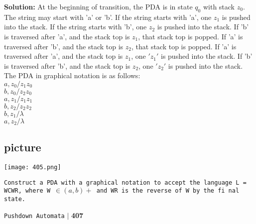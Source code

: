 \documentclass{article}
\begin{document}
\textbf{Solution: }At the beginning of transition, the PDA is in state $q_0$ with stack $z_0$. The string may start with
'a' or 'b'. If the string starts with 'a', one $z_1$ is pushed into the stack. If the string starts with 'b', one $z_2$
is pushed into the stack. If 'b' is traversed after 'a', and the stack top is $z_1$, that stack top is popped. If 'a'
is traversed after 'b', and the stack top is $z_2$, that stack top is popped. If 'a' is traversed after 'a', and the
stack top is $z_1$, one $'z_1'$ is pushed into the stack. If 'b' is traversed after 'b', and the stack top is $z_2$, one
$'z_2'$ is pushed into the stack.\\


\hspace*{0.5cm} The PDA in graphical notation is as follows:\\

\hspace*{4cm} $a, z_0/z_1z_0$ \\
\hspace*{4cm} $b, z_0/z_2z_0$ \\
\hspace*{4cm} $a, z_1/ z_1z_1$ \\
\hspace*{4cm} $b, z_2/z_2z_2$ \\
\hspace*{4cm} $b, z_1/\lambda$ \\
\hspace*{4cm} $a, z_2/\lambda$ \\


\begin{center}
\section{picture}
\texttt{[image: 405.png]}
\end{center}

\hspace*{0.1cm} \texttt{\small{Construct a PDA with a graphical notation to accept the language L = {WCWR, where
W $\in (a, b)+$ and WR is the reverse of W} by the fi nal state.}} \\

\newpage
\begin{flushright}
 \texttt{Pushdown Automata} \hspace*{0.10cm}\textbf{$|$} \textbf{407}\hspace*{0.5cm}
\end{flushright}
\end{document}
